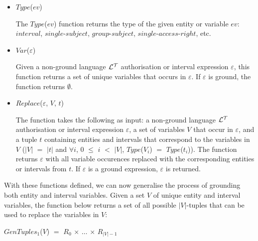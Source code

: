 \documentclass[11pt]{report}
\newenvironment{vquote}
{
  \begin{list}{}{\leftmargin 1em}\item[]
}
{
  \end{list}
}
\begin{document}
\begin{itemize}
              \begin{itemize}
                \item
                  $Type$($ev$)

                  The $Type$($ev$) function returns the type of the given
                  entity or variable $ev$: $interval$, $single$-$subject$,
                  $group$-$subject$, $single$-$access$-$right$, etc.

                \item
                  $Var$($\varepsilon$)

                  Given a non-ground language ${\cal L^T}$ authorisation or
                  interval expression $\varepsilon$, this function returns
                  a set of unique variables that occurs in $\varepsilon$. If
                  $\varepsilon$ is ground, the function returns $\emptyset$.

                \item
                  $Replace$($\varepsilon$, $V$, $t$)

                  The function takes the following as input: a non-ground
                  language ${\cal L^T}$ authorisation or interval expression
                  $\varepsilon$, a set of variables $V$ that occur in
                  $\varepsilon$, and a tuple $t$ containing entities and
                  intervals that correspond to the variables in $V$ ($|V|$ $=$
                  $|t|$ and $\forall$$i$, $0$ $\leq$ $i$ $<$ $|V|$,
                  $Type$($V_i$) $=$ $Type$($t_i$)). The function returns
                  $\varepsilon$ with all variable occurences replaced with the
                  corresponding entities or intervals from $t$. If
                  $\varepsilon$ is a ground expression, $\varepsilon$ is
                  returned.
              \end{itemize}

              With these functions defined, we can now generalise the process
              of grounding both entity and interval variables. Given a set $V$
              of unique entity and interval variables, the function below
              returns a set of all possible $|V|$-tuples that can be used to
              replace the variables in $V$:

              \begin{vquote}
                $GenTuples_1$($V$) $=$
                $R_0$ $\times$ $\ldots$ $\times$ $R_{|V|-1}$
              \end{vquote}


\end{itemize}
\end{document}
